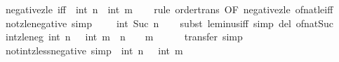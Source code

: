 \begin{isabellebody}
%
\isadelimproof
\isanewline
%
\endisadelimproof
\isanewline
{}\isamarkupfalse%
\ negative{\isacharunderscore}{\kern0pt}zle\ {\isacharbrackleft}{\kern0pt}iff{\isacharbrackright}{\kern0pt}{\isacharcolon}{\kern0pt}\ {\isachardoublequoteopen}{\isacharminus}{\kern0pt}\ int\ n\ {\isasymle}\ int\ m{\isachardoublequoteclose}\isanewline
%
\isadelimproof
\ \ %
\endisadelimproof
%
\isatagproof
{}\isamarkupfalse%
\ {\isacharparenleft}{\kern0pt}rule\ order{\isacharunderscore}{\kern0pt}trans\ {\isacharbrackleft}{\kern0pt}OF\ negative{\isacharunderscore}{\kern0pt}zle{\isacharunderscore}{\kern0pt}{}\ of{\isacharunderscore}{\kern0pt}nat{\isacharunderscore}{\kern0pt}{}{\isacharunderscore}{\kern0pt}le{\isacharunderscore}{\kern0pt}iff{\isacharbrackright}{\kern0pt}{\isacharparenright}{\kern0pt}%
\endisatagproof
{\isafoldproof}%
%
\isadelimproof
\isanewline
%
\endisadelimproof
\isanewline
{}\isamarkupfalse%
\ not{\isacharunderscore}{\kern0pt}zle{\isacharunderscore}{\kern0pt}{}{\isacharunderscore}{\kern0pt}negative\ {\isacharbrackleft}{\kern0pt}simp{\isacharbrackright}{\kern0pt}{\isacharcolon}{\kern0pt}\ {\isachardoublequoteopen}{\isasymnot}\ {}\ {\isasymle}\ {\isacharminus}{\kern0pt}\ int\ {\isacharparenleft}{\kern0pt}Suc\ n{\isacharparenright}{\kern0pt}{\isachardoublequoteclose}\isanewline
%
\isadelimproof
\ \ %
\endisadelimproof
%
\isatagproof
{}\isamarkupfalse%
\ {\isacharparenleft}{\kern0pt}subst\ le{\isacharunderscore}{\kern0pt}minus{\isacharunderscore}{\kern0pt}iff{\isacharparenright}{\kern0pt}\ {\isacharparenleft}{\kern0pt}simp\ del{\isacharcolon}{\kern0pt}\ of{\isacharunderscore}{\kern0pt}nat{\isacharunderscore}{\kern0pt}Suc{\isacharparenright}{\kern0pt}%
\endisatagproof
{\isafoldproof}%
%
\isadelimproof
\isanewline
%
\endisadelimproof
\isanewline
{}\isamarkupfalse%
\ int{\isacharunderscore}{\kern0pt}zle{\isacharunderscore}{\kern0pt}neg{\isacharcolon}{\kern0pt}\ {\isachardoublequoteopen}int\ n\ {\isasymle}\ {\isacharminus}{\kern0pt}\ int\ m\ {\isasymlongleftrightarrow}\ n\ {\isacharequal}{\kern0pt}\ {}\ {\isasymand}\ m\ {\isacharequal}{\kern0pt}\ {}{\isachardoublequoteclose}\isanewline
%
\isadelimproof
\ \ %
\endisadelimproof
%
\isatagproof
{}\isamarkupfalse%
\ transfer\ simp%
\endisatagproof
{\isafoldproof}%
%
\isadelimproof
\isanewline
%
\endisadelimproof
\isanewline
{}\isamarkupfalse%
\ not{\isacharunderscore}{\kern0pt}int{\isacharunderscore}{\kern0pt}zless{\isacharunderscore}{\kern0pt}negative\ {\isacharbrackleft}{\kern0pt}simp{\isacharbrackright}{\kern0pt}{\isacharcolon}{\kern0pt}\ {\isachardoublequoteopen}{\isasymnot}\ int\ n\ {\isacharless}{\kern0pt}\ {\isacharminus}{\kern0pt}\ int\ m{\isachardoublequoteclose}\isanewline

\end{isabellebody}
